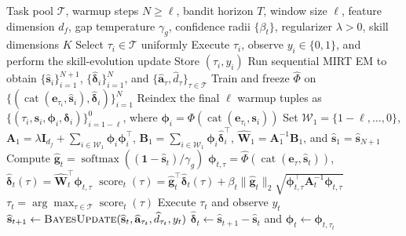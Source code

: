 \documentclass{article} %
\begin{document}
\begin{algorithm}[t]
\caption{SPG-Bandit}
\label{alg:spg}
\begin{algorithmic}
 Task pool \(\mathcal{T}\), warmup steps \(N\geq\ell\), bandit horizon \(T\), window size \(\ell\), feature dimension \(d_f\), gap temperature \(\gamma_g\), confidence radii \(\{\beta_t\}\), regularizer \(\lambda>0\), skill dimensions \(K\)
    \STATE Select \(\tau_i \in \mathcal{T}\) uniformly
    \STATE Execute \(\tau_i\), observe \(y_i\in\{0,1\}\), and perform the skill-evolution update
    \STATE Store \((\tau_i,y_i)\)
\ENDFOR
\STATE Run sequential MIRT EM to obtain \(\{\widehat{\mathbf{s}}_i\}_{i=1}^{N+1}\), \(\{\widehat{\boldsymbol{\delta}}_i\}_{i=1}^{N}\), and \(\{\widehat{\mathbf{a}}_\tau,\widehat d_\tau\}_{\tau\in\mathcal{T}}\)
\STATE Train and freeze \(\widehat\Phi\) on \(\{(\operatorname{cat}(\mathbf{e}_{\tau_i},\widehat{\mathbf{s}}_i),\widehat{\boldsymbol{\delta}}_i)\}_{i=1}^{N}\)
\STATE Reindex the final \(\ell\) warmup tuples as \(\{(\tau_i,\mathbf{s}_i,\boldsymbol{\phi}_i,\boldsymbol{\delta}_i)\}_{i=1-\ell}^{0}\), where \(\boldsymbol{\phi}_i=\Phi(\operatorname{cat}(\mathbf{e}_{\tau_i},\mathbf{s}_i))\)
\STATE Set \(\mathcal{W}_1=\{1-\ell,\ldots,0\}\), \(\mathbf{A}_1=\lambda\mathbf{I}_{d_f}+\sum_{i\in\mathcal{W}_1}\boldsymbol{\phi}_i\boldsymbol{\phi}_i^\top\), \(\mathbf{B}_1=\sum_{i\in\mathcal{W}_1}\boldsymbol{\phi}_i\widehat{\boldsymbol{\delta}}_i^\top\), \(\widehat{\mathbf{W}}_1=\mathbf{A}_1^{-1}\mathbf{B}_1\), and \(\widehat{\mathbf{s}}_1=\widehat{\mathbf{s}}_{N+1}\)
    \STATE Compute \(\widehat{\mathbf{g}}_t=\operatorname{softmax}((\mathbf{1}-\widehat{\mathbf{s}}_t)/\gamma_g)\)
        \STATE \(\boldsymbol{\phi}_{t,\tau}=\widehat\Phi(\operatorname{cat}(\mathbf{e}_\tau,\widehat{\mathbf{s}}_t))\), \(\widehat{\boldsymbol{\delta}}_t(\tau)=\widehat{\mathbf{W}}_t^\top\boldsymbol{\phi}_{t,\tau}\)
        \STATE \(\operatorname{score}_t(\tau)=\widehat{\mathbf{g}}_t^\top\widehat{\boldsymbol{\delta}}_t(\tau)+\beta_t\lVert\widehat{\mathbf{g}}_t\rVert_2\sqrt{\boldsymbol{\phi}_{t,\tau}^\top\mathbf{A}_t^{-1}\boldsymbol{\phi}_{t,\tau}}\)
    \ENDFOR
    \STATE \(\tau_t=\arg\max_{\tau\in\mathcal{T}}\operatorname{score}_t(\tau)\)
    \STATE Execute \(\tau_t\) and observe \(y_t\)
    \STATE \(\widehat{\mathbf{s}}_{t+1}\gets\textsc{BayesUpdate}(\widehat{\mathbf{s}}_t,\widehat{\mathbf{a}}_{\tau_t},\widehat d_{\tau_t},y_t)\)
    \STATE \(\widehat{\boldsymbol{\delta}}_t\gets\widehat{\mathbf{s}}_{t+1}-\widehat{\mathbf{s}}_t\) and \(\boldsymbol{\phi}_t\gets\boldsymbol{\phi}_{t,\tau_t}\)

\end{algorithmic}
\end{algorithm}
\end{document}
